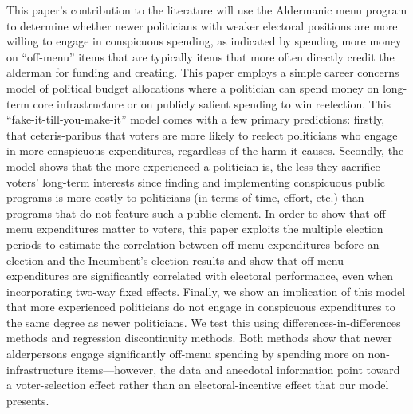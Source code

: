 This paper's contribution to the literature will use the Aldermanic menu program to determine whether newer politicians with weaker electoral positions are more willing to engage in conspicuous spending, as indicated by spending more money on ``off-menu'' items that are typically items that more often directly credit the alderman for funding and creating. 
This paper employs a simple career concerns model of political budget allocations where a politician can spend money on long-term core infrastructure or on publicly salient spending to win reelection. 
This ``fake-it-till-you-make-it'' model comes with a few primary predictions: firstly, that ceteris-paribus that voters are more likely to reelect politicians who engage in more conspicuous expenditures, regardless of the harm it causes. 
Secondly, the model shows that the more experienced a politician is, the less they sacrifice voters' long-term interests since finding and implementing conspicuous public programs is more costly to politicians (in terms of time, effort, etc.) than programs that do not feature such a public element. 
In order to show that off-menu expenditures matter to voters, this paper exploits the multiple election periods to estimate the correlation between off-menu expenditures before an election and the Incumbent's election results and show that off-menu expenditures are significantly correlated with electoral performance, even when incorporating two-way fixed effects. 
Finally, we show an implication of this model that more experienced politicians do not engage in conspicuous expenditures to the same degree as newer politicians. 
We test this using differences-in-differences methods and regression discontinuity methods. 
Both methods show that newer alderpersons engage significantly off-menu spending by spending more on non-infrastructure items—however, the data and anecdotal information point toward a voter-selection effect rather than an electoral-incentive effect that our model presents. 


